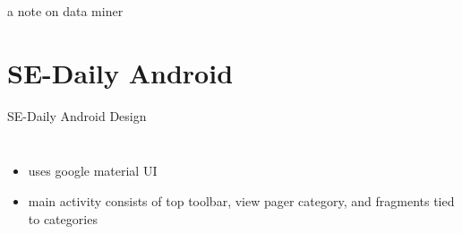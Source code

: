 \documentclass[9pt]{beamer}
\begin{document}

\begin{frame}{a note on data miner}
\end{frame}


\section{SE-Daily Android}
\begin{frame}{SE-Daily Android Design}
  \begin{columns}
    \begin{itemize}
    \item uses google material UI
      \pause
    \item main activity consists of top toolbar, view pager category, and fragments tied to categories
    \end{itemize}
  \end{columns}
\end{frame}

\end{document}
